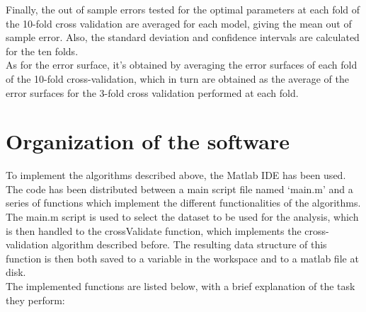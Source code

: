 \documentclass[10pt, journal]{IEEEtran}
\begin{document}
Finally, the out of sample errors tested for the optimal parameters at each fold of the 10-fold cross validation are averaged for each model, giving the mean out of sample error. Also, the standard deviation and confidence intervals are calculated for the ten folds.\\

As for the error surface, it’s obtained by averaging the error surfaces of each fold of the 10-fold cross-validation, which in turn are obtained as the average of the error surfaces for the 3-fold cross validation performed at each fold.\\


\section{Organization of the software} %
\label{sec:organization_of_the_software}
To implement the algorithms described above, the Matlab IDE has been used. The code has been distributed between a main script file named ‘main.m’ and a series of functions which implement the different functionalities of the algorithms.\\

The main.m script is used to select the dataset to be used for the analysis, which is then handled to the crossValidate function, which implements the cross-validation algorithm described before. The resulting data structure of this function is then both saved to a variable in the workspace and to a matlab file at disk.\\

The implemented functions are listed below, with a brief explanation of the task they perform:
\end{document}
